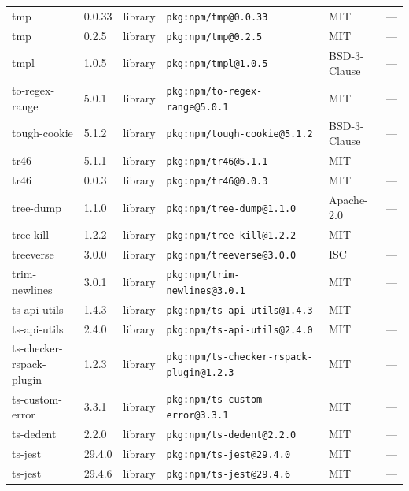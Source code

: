 \documentclass[11pt,a4paper]{article}
\begin{document}
\begin{longtable}{|p{4cm}|p{2cm}|p{1.6cm}|p{5cm}|p{1.5cm}|p{3.5cm}|}
\raggedright tmp & 0.0.33 & library & \small\texttt{pkg:npm/tmp@0.0.33} & MIT & \small — \\
\raggedright tmp & 0.2.5 & library & \small\texttt{pkg:npm/tmp@0.2.5} & MIT & \small — \\
\raggedright tmpl & 1.0.5 & library & \small\texttt{pkg:npm/tmpl@1.0.5} & BSD-3-Clause & \small — \\
\raggedright to-regex-range & 5.0.1 & library & \small\texttt{pkg:npm/to-regex-range@5.0.1} & MIT & \small — \\
\raggedright tough-cookie & 5.1.2 & library & \small\texttt{pkg:npm/tough-cookie@5.1.2} & BSD-3-Clause & \small — \\
\raggedright tr46 & 5.1.1 & library & \small\texttt{pkg:npm/tr46@5.1.1} & MIT & \small — \\
\raggedright tr46 & 0.0.3 & library & \small\texttt{pkg:npm/tr46@0.0.3} & MIT & \small — \\
\raggedright tree-dump & 1.1.0 & library & \small\texttt{pkg:npm/tree-dump@1.1.0} & Apache-2.0 & \small — \\
\raggedright tree-kill & 1.2.2 & library & \small\texttt{pkg:npm/tree-kill@1.2.2} & MIT & \small — \\
\raggedright treeverse & 3.0.0 & library & \small\texttt{pkg:npm/treeverse@3.0.0} & ISC & \small — \\
\raggedright trim-newlines & 3.0.1 & library & \small\texttt{pkg:npm/trim-newlines@3.0.1} & MIT & \small — \\
\raggedright ts-api-utils & 1.4.3 & library & \small\texttt{pkg:npm/ts-api-utils@1.4.3} & MIT & \small — \\
\raggedright ts-api-utils & 2.4.0 & library & \small\texttt{pkg:npm/ts-api-utils@2.4.0} & MIT & \small — \\
\raggedright ts-checker-rspack-plugin & 1.2.3 & library & \small\texttt{pkg:npm/ts-checker-rspack-plugin@1.2.3} & MIT & \small — \\
\raggedright ts-custom-error & 3.3.1 & library & \small\texttt{pkg:npm/ts-custom-error@3.3.1} & MIT & \small — \\
\raggedright ts-dedent & 2.2.0 & library & \small\texttt{pkg:npm/ts-dedent@2.2.0} & MIT & \small — \\
\raggedright ts-jest & 29.4.0 & library & \small\texttt{pkg:npm/ts-jest@29.4.0} & MIT & \small — \\
\raggedright ts-jest & 29.4.6 & library & \small\texttt{pkg:npm/ts-jest@29.4.6} & MIT & \small — \\

\end{longtable}
\end{document}
